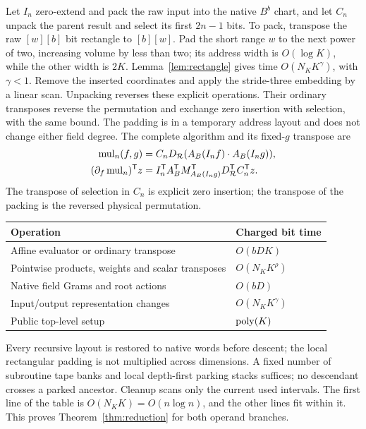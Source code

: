 Let $I_n$ zero-extend and pack the raw input into the native $B^b$
chart, and let $C_n$ unpack the parent result and select its first
$2n-1$ bits. To pack, transpose the raw $[w][b]$ bit rectangle to
$[b][w]$. Pad the short range $w$ to the next power of two, increasing
volume by less than two; its address width is $O(\log K)$, while the
other width is $2K$. Lemma~\ref{lem:rectangle} gives time
$O(N_KK^\gamma)$, with $\gamma<1$. Remove the inserted coordinates
and apply the stride-three embedding by a linear scan. Unpacking
reverses these explicit operations. Their ordinary transposes reverse
the permutation and exchange zero insertion with selection, with the
same bound. The padding is in a temporary address layout and does not
change either field degree.
The complete algorithm and its fixed-$g$ transpose are
\begin{align}
 \operatorname{mul}_n(f,g)
 &=C_nD_{\mathcal R}(A_B(I_nf)\cdot A_B(I_ng)),\label{eq:rawmul}\\
 (\partial_f\operatorname{mul}_n)^{\mathsf T}z
 &=I_n^{\mathsf T}A_B^{\mathsf T}M_{A_B(I_ng)}^{\mathsf T}
             D_{\mathcal R}^{\mathsf T}C_n^{\mathsf T}z.\label{eq:rawadjoint}
\end{align}
The transpose of selection in $C_n$ is explicit zero insertion; the
transpose of the packing is the reversed physical permutation.

\begin{center}
\begin{tabular}{@{}ll@{}}
\toprule
Operation & Charged bit time\\
\midrule
Affine evaluator or ordinary transpose & $O(bDK)$\\
Pointwise products, weights and scalar transposes & $O(N_KK^\rho)$\\
Native field Grams and root actions & $O(bD)$\\
Input/output representation changes & $O(N_KK^\gamma)$\\
Public top-level setup & $\operatorname{poly}(K)$\\
\bottomrule
\end{tabular}
\end{center}
Every recursive layout is restored to native words before descent;
the local rectangular padding is not multiplied across dimensions.
A fixed number of subroutine tape banks and local depth-first parking
stacks suffices; no descendant crosses a parked ancestor. Cleanup
scans only the current used intervals. The first line of the table is
$O(N_KK)=O(n\log n)$, and the other lines fit within it.
This proves Theorem~\ref{thm:reduction} for both operand branches.

